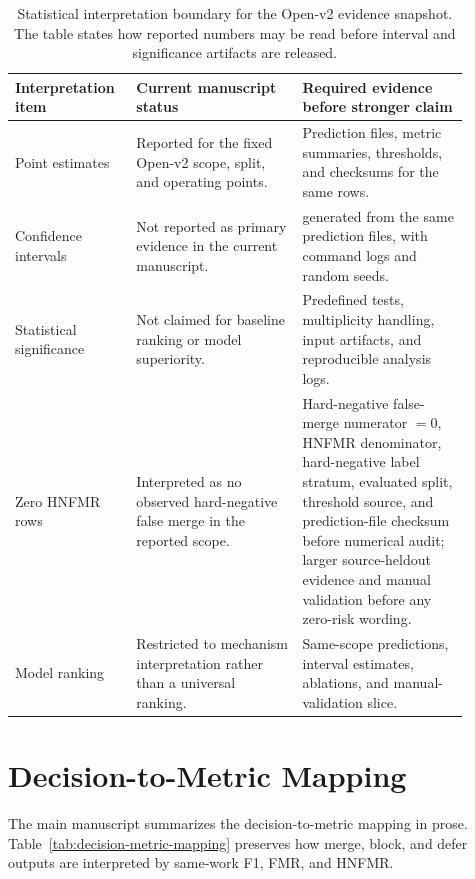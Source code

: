 \documentclass[11pt]{article}
\begin{document}
\begin{table}[H]
\caption{Statistical interpretation boundary for the Open-v2 evidence snapshot. The table states how reported numbers may be read before interval and significance artifacts are released.}
\label{tab:statistical-interpretation-boundary}
\centering
\footnotesize
\setlength{\tabcolsep}{3pt}
\begin{tabular}{L{0.22\linewidth}L{0.34\linewidth}L{0.34\linewidth}}
\toprule
Interpretation item & Current manuscript status & Required evidence before stronger claim \\
\midrule
Point estimates & Reported for the fixed Open-v2 scope, split, and operating points. & Prediction files, metric summaries, thresholds, and checksums for the same rows. \\
Confidence intervals & Not reported as primary evidence in the current manuscript. &  generated from the same prediction files, with command logs and random seeds. \\
Statistical significance & Not claimed for baseline ranking or model superiority. & Predefined tests, multiplicity handling, input artifacts, and reproducible analysis logs. \\
Zero HNFMR rows & Interpreted as no observed hard-negative false merge in the reported scope. & Hard-negative false-merge numerator $=0$, HNFMR denominator, hard-negative label stratum, evaluated split, threshold source, and prediction-file checksum before numerical audit; larger source-heldout evidence and manual validation before any zero-risk wording. \\
Model ranking & Restricted to mechanism interpretation rather than a universal ranking. & Same-scope predictions, interval estimates, ablations, and manual-validation slice. \\
\bottomrule
\end{tabular}
\end{table}

\section{Decision-to-Metric Mapping}

The main manuscript summarizes the decision-to-metric mapping in prose. Table~\ref{tab:decision-metric-mapping} preserves how merge, block, and defer outputs are interpreted by same-work F1, FMR, and HNFMR.
\end{document}
